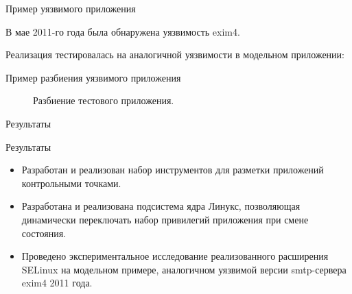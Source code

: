 \documentclass{beamer}
\begin{document}
\begin{frame}[fragile]{Пример уязвимого приложения}

\begin{small}
В мае 2011-го года была обнаружена уязвимость exim4.

Реализация тестировалась на аналогичной уязвимости в модельном приложении:
\end{small}

\scalebox{.50}{}

\end{frame}
\begin{frame}[fragile]{Пример разбиения уязвимого приложения}
\begin{figure}
\scalebox{.70}{}
\caption{Разбиение тестового приложения.}
\end{figure}
\end{frame}

\begin{frame}{Результаты}
\begin{block}{Результаты}
\begin{itemize}

\item Разработан и реализован набор инструментов для разметки приложений
        контрольными точками.

\item Разработана и реализована подсистема ядра Линукс, позволяющая
        динамически переключать набор привилегий приложения при
        смене состояния.

\item Проведено экспериментальное исследование реализованного расширения SELinux
        на модельном примере, аналогичном уязвимой версии smtp-сервера
        exim4 2011 года.

\end{itemize}
\end{block}
\end{frame}
\end{document}
